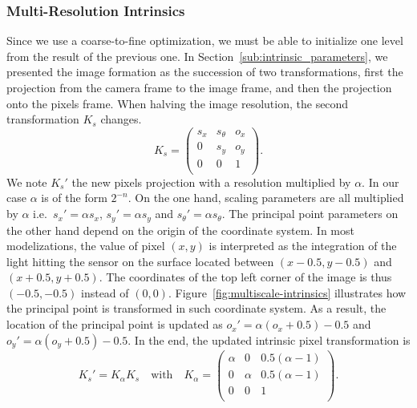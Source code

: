\subsubsection{Multi-Resolution Intrinsics}%
\label{ssub:multires-intrinsics}

Since we use a coarse-to-fine optimization,
we must be able to initialize one level from the result of the previous one.
In Section~\ref{sub:intrinsic_parameters}, we presented the image formation as
the succession of two transformations, first the projection from the camera frame
to the image frame, and then the projection onto the pixels frame.
When halving the image resolution, the second transformation $K_s$ changes.
\[
	K_s = \begin{pmatrix}
		s_x & s_{\theta} & o_x \\
		0 & s_y & o_y \\
		0 & 0 & 1 \\
	\end{pmatrix}.
\]
We note $K_s'$ the new pixels projection with a resolution multiplied by $\alpha$.
In our case $\alpha$ is of the form $2^{-n}$.
On the one hand, scaling parameters are all multiplied by $\alpha$ i.e.\
$s_x' = \alpha s_x$,
$s_y' = \alpha s_y$ and
$s_{\theta}' = \alpha s_{\theta}$.
The principal point parameters on the other hand depend on the origin of the coordinate system.
In most modelizations, the value of pixel $(x,y)$ is interpreted as the integration
of the light hitting the sensor on the surface located between $(x-0.5, y-0.5)$
and $(x+0.5, y+0.5)$.
The coordinates of the top left corner of the image is thus $(-0.5, -0.5)$
instead of $(0,0)$.
Figure~\ref{fig:multiscale-intrinsics} illustrates how
the principal point is transformed in such coordinate system.
As a result, the location of the principal point is updated as
$o_x' = \alpha(o_x + 0.5) - 0.5$ and
$o_y' = \alpha(o_y + 0.5) - 0.5$.
In the end, the updated intrinsic pixel transformation is
\[
	K_s' = K_{\alpha}K_s \quad \text{with} \quad
	K_{\alpha} = \begin{pmatrix}
		\alpha & 0 & 0.5(\alpha - 1) \\
		0 & \alpha & 0.5(\alpha - 1) \\
		0 & 0 & 1 \\
	\end{pmatrix}.
\]

